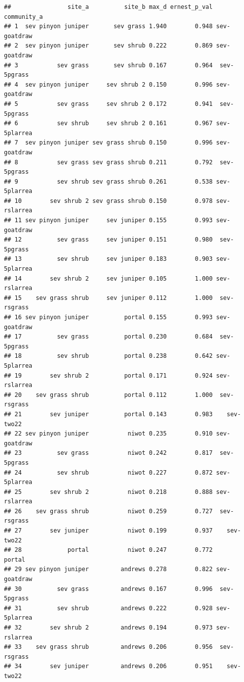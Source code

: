 \documentclass[]{article}
\begin{document}
\begin{verbatim}
##                site_a          site_b max_d ernest_p_val  community_a
## 1  sev pinyon juniper       sev grass 1.940        0.948 sev-goatdraw
## 2  sev pinyon juniper       sev shrub 0.222        0.869 sev-goatdraw
## 3           sev grass       sev shrub 0.167        0.964  sev-5pgrass
## 4  sev pinyon juniper     sev shrub 2 0.150        0.996 sev-goatdraw
## 5           sev grass     sev shrub 2 0.172        0.941  sev-5pgrass
## 6           sev shrub     sev shrub 2 0.161        0.967 sev-5plarrea
## 7  sev pinyon juniper sev grass shrub 0.150        0.996 sev-goatdraw
## 8           sev grass sev grass shrub 0.211        0.792  sev-5pgrass
## 9           sev shrub sev grass shrub 0.261        0.538 sev-5plarrea
## 10        sev shrub 2 sev grass shrub 0.150        0.978 sev-rslarrea
## 11 sev pinyon juniper     sev juniper 0.155        0.993 sev-goatdraw
## 12          sev grass     sev juniper 0.151        0.980  sev-5pgrass
## 13          sev shrub     sev juniper 0.183        0.903 sev-5plarrea
## 14        sev shrub 2     sev juniper 0.105        1.000 sev-rslarrea
## 15    sev grass shrub     sev juniper 0.112        1.000  sev-rsgrass
## 16 sev pinyon juniper          portal 0.155        0.993 sev-goatdraw
## 17          sev grass          portal 0.230        0.684  sev-5pgrass
## 18          sev shrub          portal 0.238        0.642 sev-5plarrea
## 19        sev shrub 2          portal 0.171        0.924 sev-rslarrea
## 20    sev grass shrub          portal 0.112        1.000  sev-rsgrass
## 21        sev juniper          portal 0.143        0.983    sev-two22
## 22 sev pinyon juniper           niwot 0.235        0.910 sev-goatdraw
## 23          sev grass           niwot 0.242        0.817  sev-5pgrass
## 24          sev shrub           niwot 0.227        0.872 sev-5plarrea
## 25        sev shrub 2           niwot 0.218        0.888 sev-rslarrea
## 26    sev grass shrub           niwot 0.259        0.727  sev-rsgrass
## 27        sev juniper           niwot 0.199        0.937    sev-two22
## 28             portal           niwot 0.247        0.772       portal
## 29 sev pinyon juniper         andrews 0.278        0.822 sev-goatdraw
## 30          sev grass         andrews 0.167        0.996  sev-5pgrass
## 31          sev shrub         andrews 0.222        0.928 sev-5plarrea
## 32        sev shrub 2         andrews 0.194        0.973 sev-rslarrea
## 33    sev grass shrub         andrews 0.206        0.956  sev-rsgrass
## 34        sev juniper         andrews 0.206        0.951    sev-two22

\end{verbatim}
\end{document}
